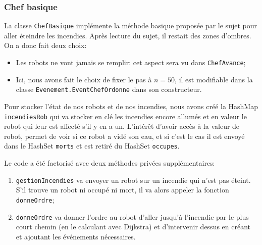 \documentclass[a4paper,8pt]{article} %
\begin{document}
\subsubsection{Chef basique}
La  classe \texttt{ChefBasique} implémente la méthode basique proposée par le sujet pour aller éteindre les incendies.
Après lecture du sujet, il restait des zones d'ombres. On a donc fait deux choix:
\begin{itemize}
    \item Les robots ne vont jamais se remplir: cet aspect sera vu dans \texttt{ChefAvance};
    \item Ici, nous avons fait le choix de fixer le pas à $n=50$, il est modifiable dans la classe \texttt{Evenement.EventChefOrdonne} 
    dans son constructeur.
\end{itemize}

Pour stocker l'état de nos robots et de nos incendies, nous avons créé la HashMap \texttt{incendiesRob} qui va stocker en clé 
les incendies encore allumés et en valeur le robot qui leur est affecté s'il y en a un. L'intérêt d'avoir accès à la valeur de robot,
permet de voir si ce robot a vidé son eau, et si c'est le cas il est envoyé dans le HashSet \texttt{morts} 
et est retiré du HashSet \texttt{occupes}.

Le code a été factorisé avec deux méthodes privées supplémentaires:
\begin{enumerate}
    \item \texttt{gestionIncendies} va envoyer un robot sur un incendie qui n'est pas éteint. S'il trouve un robot ni occupé ni mort,
    il va alors appeler la fonction \texttt{donneOrdre};
    \item \texttt{donneOrdre} va donner l'ordre au robot d'aller jusqu'à l'incendie par le plus court chemin (en le calculant avec Dijkstra)
    et d'intervenir dessus en créant et ajoutant les événements nécessaires.
\end{enumerate}
\end{document}
